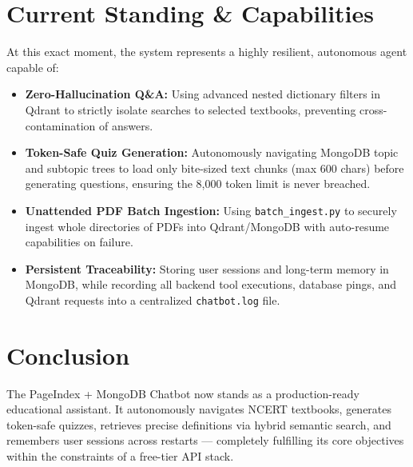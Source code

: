 \documentclass[12pt, a4paper]{article}
\begin{document}
\section{Current Standing \& Capabilities}
At this exact moment, the system represents a highly resilient, autonomous agent capable of:
\begin{itemize}[label=\(\bullet\)]
    \item \textbf{Zero-Hallucination Q\&A:} Using advanced nested dictionary filters in Qdrant to strictly isolate searches to selected textbooks, preventing cross-contamination of answers.
    \item \textbf{Token-Safe Quiz Generation:} Autonomously navigating MongoDB topic and subtopic trees to load only bite-sized text chunks (max 600 chars) before generating questions, ensuring the 8,000 token limit is never breached.
    \item \textbf{Unattended PDF Batch Ingestion:} Using \texttt{batch\_ingest.py} to securely ingest whole directories of PDFs into Qdrant/MongoDB with auto-resume capabilities on failure.
    \item \textbf{Persistent Traceability:} Storing user sessions and long-term memory in MongoDB, while recording all backend tool executions, database pings, and Qdrant requests into a centralized \texttt{chatbot.log} file.
\end{itemize}

\section{Conclusion}
The PageIndex + MongoDB Chatbot now stands as a production-ready educational assistant. It autonomously navigates NCERT textbooks, generates token-safe quizzes, retrieves precise definitions via hybrid semantic search, and remembers user sessions across restarts — completely fulfilling its core objectives within the constraints of a free-tier API stack.
\end{document}

